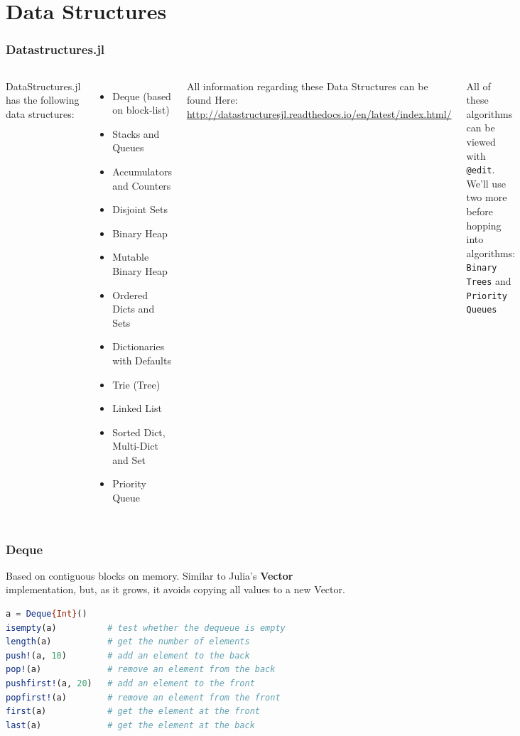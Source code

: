 \documentclass{beamer}
\begin{document}
\section{Data Structures}

\begin{frame}
\frametitle{Datastructures.jl}

\begin{columns}
DataStructures.jl has the following data structures:
\begin{itemize}
\item Deque (based on block-list)
\item Stacks and Queues
\item Accumulators and Counters
\item Disjoint Sets
\item Binary Heap
\item Mutable Binary Heap 
\item Ordered Dicts and Sets
\item Dictionaries with Defaults
\item Trie (Tree)
\item Linked List
\item Sorted Dict, Multi-Dict and Set
\item Priority Queue
\end{itemize}
\pause
{}
All information regarding these Data Structures can be found Here: \url{ http://datastructuresjl.readthedocs.io/en/latest/index.html/}

\vspace{0.5cm}
All of these algorithms can be viewed with \texttt{@edit}. We'll use two more before hopping into algorithms: \texttt{Binary Trees} and \texttt{Priority Queues}
\end{columns}

\end{frame}

\begin{frame}[fragile]
\frametitle{Deque}
Based on contiguous blocks on memory. Similar to Julia's \textbf{Vector} implementation, but, as it grows, it avoids copying all values to a new Vector. 
\begin{lstlisting}[language=julia]
a = Deque{Int}()
isempty(a)          # test whether the dequeue is empty
length(a)           # get the number of elements
push!(a, 10)        # add an element to the back
pop!(a)             # remove an element from the back
pushfirst!(a, 20)   # add an element to the front
popfirst!(a)        # remove an element from the front
first(a)            # get the element at the front
last(a)             # get the element at the back
\end{lstlisting}
\end{frame}
\end{document}

